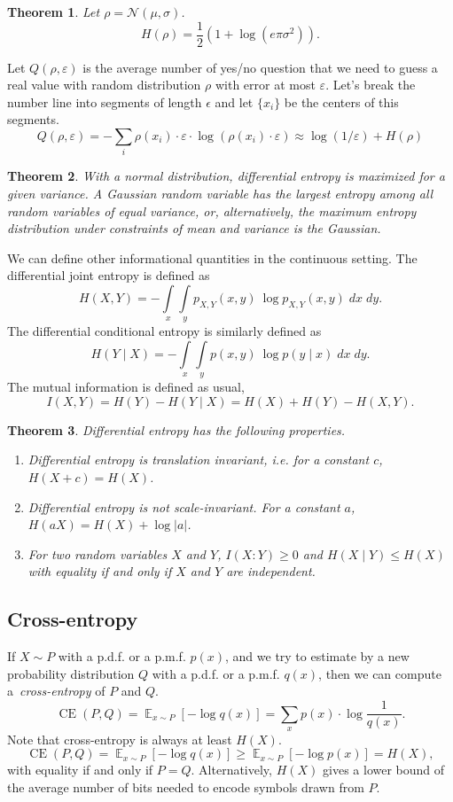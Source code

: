 \documentclass[12pt,sans]{article}
\DeclareMathOperator*{\E}{\mathbb{E}}
\DeclareMathOperator{\CE}{CE}
\theoremstyle{definition}
\theoremstyle{plain}
\newtheorem{theorem}{Theorem}[section]
\theoremstyle{remark}
\begin{document}
\begin{theorem}
Let $\rho = \mathcal{N}(\mu,\sigma)$.
\[
H(\rho) = \frac{1}{2}(1+\log(e\pi\sigma^2)).
\]
\end{theorem}

Let $Q(\rho, \varepsilon)$ is the average number of yes/no question that
we need to guess a real value with random distribution $\rho$ with error at most $\varepsilon$.
Let's break the number line into segments of length $\epsilon$ and let $\{x_i\}$ be the centers of this segments.
\[
    Q(\rho, \varepsilon) = -\sum_i \rho(x_i)\cdot\varepsilon\cdot\log(\rho(x_i)\cdot\varepsilon) \approx \log(1/\varepsilon) + H(\rho)
\]

\begin{theorem}
    With a normal distribution, differential entropy is maximized for a given variance. A Gaussian random variable has the largest entropy among all random variables of equal variance, or, alternatively, the maximum entropy distribution under constraints of mean and variance is the Gaussian.
\end{theorem}

We can define other informational quantities in the continuous setting.
The differential joint entropy is defined as
\[
H(X, Y) = - \int\limits_x\int\limits_y p_{X, Y}(x, y) \ \log p_{X, Y}(x, y) \;dx \;dy.
\]
The differential conditional entropy is similarly defined as
\[
H(Y \mid X) = - \int\limits_x \int\limits_y p(x, y) \ \log p(y \mid x) \;dx \;dy.
\]
The mutual information is defined as usual,
\[
    I(X,Y) = H(Y) - H(Y \mid X) = H(X) + H(Y) - H(X,Y).
\]

\begin{theorem} Differential entropy has the following properties.
    \begin{enumerate}
        \item
            Differential entropy is translation invariant, i.e. for a constant $c$, $H(X+c)=H(X)$.


        \item     Differential entropy is not scale-invariant. For a constant $a$,
         $H(aX)=H(X)+\log|a|$.


        \item For two random variables $X$ and $Y$, $I(X:Y) \ge 0$ and $H(X\mid Y)\leq H(X)$ with equality if and only if $X$ and $Y$ are independent.
    \end{enumerate}
\end{theorem}

\subsection{Cross-entropy}
If $X\sim P$ with a p.d.f. or a p.m.f. $p(x)$, and we try to estimate by a new probability distribution $Q$ with a p.d.f. or a p.m.f. $q(x)$, then we can compute a~\emph{cross-entropy} of $P$ and $Q$.
\[
    \CE(P,Q) = \E_{x \sim P} [- \log q(x)] = \sum_{x} p(x)\cdot \log\frac{1}{q(x)}.
\]
Note that cross-entropy is always at least $H(X)$.
\[
\CE(P, Q) = \E_{x \sim P} [- \log q(x)] \geq \E_{x \sim P} [- \log p(x)] = H(X),
\]
with equality if and only if $P = Q$.
Alternatively, $H(X)$ gives a lower bound of the average number of bits needed to encode symbols drawn from $P$.
\end{document}
